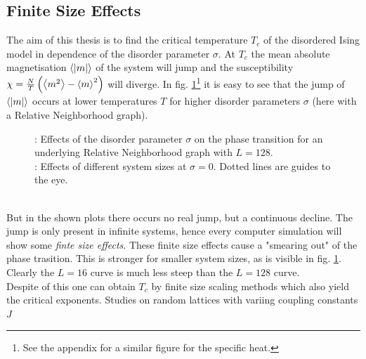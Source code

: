 \subsection{Finite Size Effects}
\label{ssec:finitesize}
    The aim of this thesis is to find the critical temperature \(T_c\)
    of the disordered Ising model in dependence of the disorder parameter
    \(\sigma\). At \(T_c\) the mean absolute magnetisation \(\left< |m| \right>\) of
    the system will jump and the susceptibility
    \(\chi = \frac{N}{T}\left(\left< m^2 \right>-\left< m \right>^2\right)\)
    will diverge. In fig. \ref{fig:smeared_out}\footnote{See the appendix for a similar figure for the specific heat.}
    it is easy to see that the jump of \(\left< |m| \right>\)
    occurs at lower temperatures \(T\) for higher
    disorder parameters \(\sigma\) (here with a Relative Neighborhood graph).
    \begin{figure}[htbp]
        \centering
        \caption[Phase Transition and Finite Size Effects]
        {
            : Effects of the disorder
            parameter $\sigma$ on the phase transition
            for an underlying Relative Neighborhood graph with $L=128$.\\
            : Effects of different system
            sizes at \(\sigma = 0\). Dotted lines are guides to the eye.
        }
        \label{fig:smeared_out}
    \end{figure}\\
    But in the shown plots there occurs no real jump, but a continuous
    decline. The jump is only present in infinite systems, hence every
    computer simulation will show some \emph{finte size effects}.
    These finite size effects cause a "smearing out" of the phase
    trasition. This is stronger for smaller system sizes, as is visible
    in fig. \ref{fig:smeared_out}. Clearly
    the \(L=16\) curve is much less steep than the \(L=128\) curve.\\
    Despite of this one can obtain \(T_c\) by finite size scaling
    methods \cite[S. ??]{NewmanBarkema1999} which also yield the critical
    exponents.
    Studies on random lattices with variing coupling constants \(J\)
